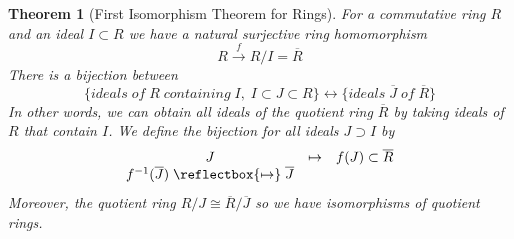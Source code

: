 \documentclass[12pt]{article}
\newtheorem{thm}{Theorem}[section]
\theoremstyle{definition}
\theoremstyle{remark}
\numberwithin{equation}{section}
\newcommand\mapsfrom{\mathrel{\reflectbox{\ensuremath{\mapsto}}}}
\begin{document}
\vspace{15pt}


\begin{thm}[First Isomorphism Theorem for Rings]
        For a commutative ring $R$ and an ideal $I \subset R$ we have a natural surjective ring homomorphism \begin{equation}
                R\xrightarrow{f} R/I = \overline{R}
        \end{equation}
        There is a bijection between \begin{equation}
                \{ideals\;of\;R\;containing\;I,\;I\subset J\subset R\}\leftrightarrow \{ideals\;\overline{J}\;of\;\overline{R}\}
        \end{equation}
        In other words, we can obtain all ideals of the quotient ring $\overline{R}$ by taking ideals of $R$ that contain $I$. We define the bijection for all ideals $J \supset I$ by \begin{equation}
                \begin{array}{ccc} J & \mapsto & f(J) \subset \overline{R} \\ f^{-1}(\overline{J}) \mapsfrom \overline{J} \end{array}
        \end{equation}
        Moreover, the quotient ring $R/J \cong \overline{R}/\overline{J}$ so we have isomorphisms of quotient rings.
\end{thm}
\end{document}
